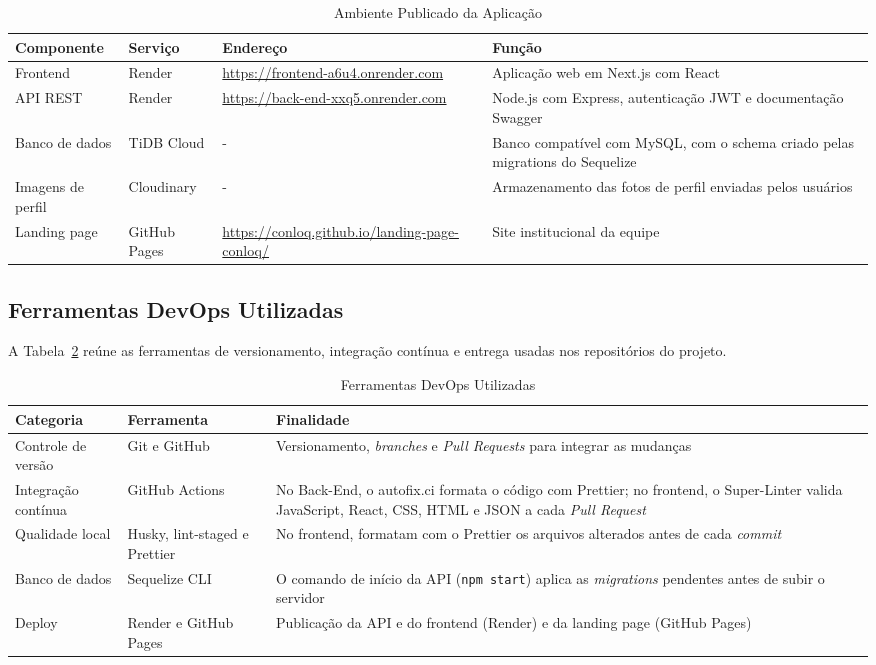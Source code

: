 \begin{table}[H]
\centering
\caption{Ambiente Publicado da Aplicação}
\label{tab:ambiente}
\begin{tabular}{|l|l|p{5.4cm}|p{4.6cm}|}
\hline
\textbf{Componente} & \textbf{Serviço} & \textbf{Endereço} & \textbf{Função} \\
\hline
Frontend & Render & \url{https://frontend-a6u4.onrender.com} & Aplicação web em Next.js com React \\
\hline
API REST & Render & \url{https://back-end-xxq5.onrender.com} & Node.js com Express, autenticação JWT e documentação Swagger \\
\hline
Banco de dados & TiDB Cloud & - & Banco compatível com MySQL, com o schema criado pelas migrations do Sequelize \\
\hline
Imagens de perfil & Cloudinary & - & Armazenamento das fotos de perfil enviadas pelos usuários \\
\hline
Landing page & GitHub Pages & \url{https://conloq.github.io/landing-page-conloq/} & Site institucional da equipe \\
\hline
\end{tabular}
\end{table}

\subsection{Ferramentas DevOps Utilizadas}

A Tabela~\ref{tab:devops} reúne as ferramentas de versionamento, integração contínua e entrega usadas nos repositórios do projeto.

\begin{table}[H]
\centering
\caption{Ferramentas DevOps Utilizadas}
\label{tab:devops}
\begin{tabular}{|p{3cm}|p{3.4cm}|p{7.6cm}|}
\hline
\textbf{Categoria} & \textbf{Ferramenta} & \textbf{Finalidade} \\
\hline
Controle de versão & Git e GitHub & Versionamento, \textit{branches} e \textit{Pull Requests} para integrar as mudanças \\
\hline
Integração contínua & GitHub Actions & No Back-End, o autofix.ci formata o código com Prettier; no frontend, o Super-Linter valida JavaScript, React, CSS, HTML e JSON a cada \textit{Pull Request} \\
\hline
Qualidade local & Husky, lint-staged e Prettier & No frontend, formatam com o Prettier os arquivos alterados antes de cada \textit{commit} \\
\hline
Banco de dados & Sequelize CLI & O comando de início da API (\texttt{npm start}) aplica as \textit{migrations} pendentes antes de subir o servidor \\
\hline
Deploy & Render e GitHub Pages & Publicação da API e do frontend (Render) e da landing page (GitHub Pages) \\
\hline
\end{tabular}
\end{table}

